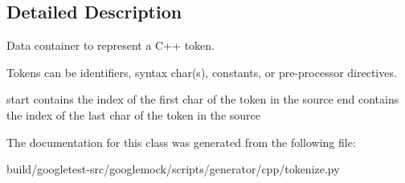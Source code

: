 \subsection{Detailed Description}
\begin{DoxyVerb}Data container to represent a C++ token.

Tokens can be identifiers, syntax char(s), constants, or
pre-processor directives.

start contains the index of the first char of the token in the source
end contains the index of the last char of the token in the source
\end{DoxyVerb}
 

The documentation for this class was generated from the following file\+:\begin{DoxyCompactItemize}
\item 
build/googletest-\/src/googlemock/scripts/generator/cpp/tokenize.\+py\end{DoxyCompactItemize}
